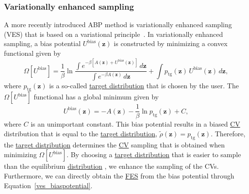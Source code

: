 \documentclass[9pt,review]{livecoms}
\newcommand{\vz}{\mathbf{z}}
\begin{document}
\subsubsection{Variationally enhanced sampling}
\label{sec:ves}
A more recently introduced ABP method is variationally enhanced
sampling (VES) that is based on a variational principle~\cite{Valsson_VES_PRL_2014,Valsson2020Handbook_VES}.
In variationally enhanced sampling, a bias potential $U^{\mathrm{bias}}(\vz)$ is constructed by minimizing a convex functional given by
\begin{equation}
\label{ves_omega}
\Omega [U^{\mathrm{bias}}] =
\frac{1}{\beta} \ln
\frac
{\int e^{-\beta \left[ A(\vz) + U^{\mathrm{bias}}(\vz)\right]} \, d\vz }
{\int e^{-\beta A(\vz)} \, d\vz}
+
\int p_{\mathrm{tg}}(\vz) \, U^{\mathrm{bias}}(\vz) \, d\vz,
\end{equation}
where $p_{\mathrm{tg}}(\vz)$ is a so-called \hyperlink{ref:targetdist}{target distribution} that is chosen by the user. The $\Omega [U^{\mathrm{bias}}]$ functional has a global minimum given by
\begin{equation}
\label{ves_biaspotential}
U^{\mathrm{bias}}(\vz) = -A(\vz)- \frac{1}{\beta} \ln {p_{\mathrm{tg}}(\vz)} + C,
\end{equation}
where $C$ is an unimportant constant. This bias potential results in a biased \hyperlink{ref:CV} {CV} distribution that is equal to the \hyperlink{ref:targetdist}{target distribution}, $\tilde{\rho}(\vz) = p_{\mathrm{tg}}(\vz)$. Therefore, the \hyperlink{ref:targetdist}{target distribution} determines the \hyperlink{ref:CV} {CV} sampling that is obtained when minimizing $\Omega [U^{\mathrm{bias}}]$. By choosing a \hyperlink{ref:targetdist}{target distribution} that is easier to sample than the equilibrium \hyperlink{ref:Distribution} {distribution} , we enhance the sampling of the CVs. Furthermore, we can directly obtain the \hyperlink{ref:FES} {FES} from the bias potential through Equation~\ref{ves_biaspotential}.
\end{document}
